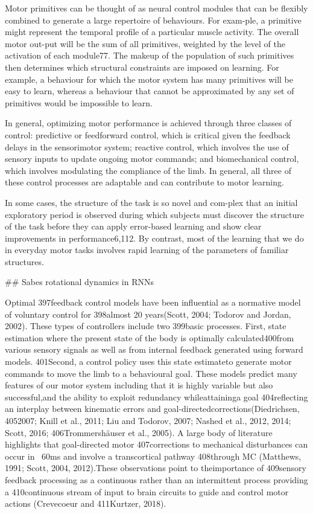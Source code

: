 \documentclass[../main.tex]{subfiles}
\begin{document}
{{Motor primitives can be thought of as neural control modules that can be flexibly combined to generate a large repertoire of behaviours. For exam-ple, a primitive might represent the temporal profile of a particular muscle activity. The overall motor out-put will be the sum of all primitives, weighted by the level of the activation of each module77. The makeup of the population of such primitives then determines which structural constraints are imposed on learning. For example, a behaviour for which the motor system has many primitives will be easy to learn, whereas a behaviour that cannot be approximated by any set of primitives would be impossible to learn.

In general, optimizing motor performance is achieved through three classes of control: predictive or feedforward control, which is critical given the feedback delays in the sensorimotor system; reactive control, which involves the use of sensory inputs to update ongoing motor commands; and biomechanical control, which involves modulating the compliance of the limb. In general, all three of these control processes are adaptable and can contribute to motor learning.

In some cases, the structure of the task is so novel and com-plex that an initial exploratory period is observed during which subjects must discover the structure of the task before they can apply error-based learning and show clear improvements in performance6,112. By contrast, most of the learning that we do in everyday motor tasks involves rapid learning of the parameters of familiar structures.

## Sabes rotational dynamics in RNNs

Optimal 397feedback control models have been influential as a normative model of voluntary control for 398almost 20 years(Scott, 2004; Todorov and Jordan, 2002). These types of controllers include two 399basic processes. First, state estimation where the present state of the body is optimally calculated400from various sensory signals as well as from internal feedback generated using forward models. 401Second, a control policy uses this state estimateto generate motor commands to move the limb to a behavioural goal. These models predict many features of our motor system including that it is highly variable but also successful,and the ability to exploit redundancy whileattaininga goal 404reflecting an interplay between kinematic errors and goal-directedcorrections(Diedrichsen, 4052007; Knill et al., 2011; Liu and Todorov, 2007; Nashed et al., 2012, 2014; Scott, 2016; 406Trommershäuser et al., 2005). A large body of literature highlights that goal-directed motor 407corrections to mechanical disturbances can occur in ~60ms and involve a transcortical pathway 408through MC (Matthews, 1991; Scott, 2004, 2012).These observations point to theimportance of 409sensory feedback processing as a continuous rather than an intermittent process providing a 410continuous stream of input to brain circuits to guide and control motor actions (Crevecoeur and 411Kurtzer, 2018).

}}
\end{document}
